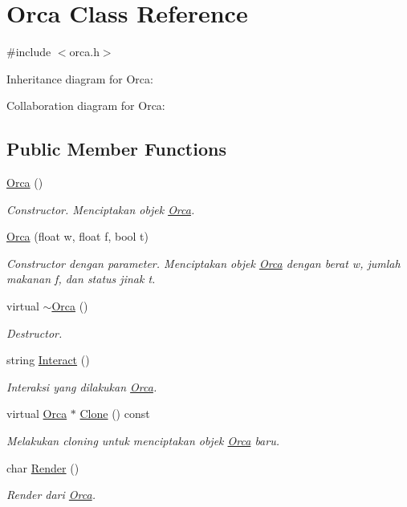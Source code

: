 \hypertarget{classOrca}{}\section{Orca Class Reference}
\label{classOrca}


{\ttfamily \#include $<$orca.\+h$>$}



Inheritance diagram for Orca\+:


Collaboration diagram for Orca\+:
\subsection*{Public Member Functions}
\begin{DoxyCompactItemize}
\item 
\hyperlink{classOrca_a1efb2589b67f95863f7c8a653cfb13f3}{Orca} ()
\begin{DoxyCompactList}\small\item\em Constructor. Menciptakan objek \hyperlink{classOrca}{Orca}. \end{DoxyCompactList}\item 
\hyperlink{classOrca_aed38e6130ea0084cc65031262bbdf39a}{Orca} (float w, float f, bool t)
\begin{DoxyCompactList}\small\item\em Constructor dengan parameter. Menciptakan objek \hyperlink{classOrca}{Orca} dengan berat w, jumlah makanan f, dan status jinak t. \end{DoxyCompactList}\item 
virtual \hyperlink{classOrca_a964d6cd8b816cfa70f5194457b9382c0}{$\sim$\+Orca} ()
\begin{DoxyCompactList}\small\item\em Destructor. \end{DoxyCompactList}\item 
string \hyperlink{classOrca_adf95ca04578ac04aaa717ef2dd11bf4c}{Interact} ()
\begin{DoxyCompactList}\small\item\em Interaksi yang dilakukan \hyperlink{classOrca}{Orca}. \end{DoxyCompactList}\item 
virtual \hyperlink{classOrca}{Orca} $\ast$ \hyperlink{classOrca_ac44eb30486ba4051eefa914dc8cd670f}{Clone} () const 
\begin{DoxyCompactList}\small\item\em Melakukan cloning untuk menciptakan objek \hyperlink{classOrca}{Orca} baru. \end{DoxyCompactList}\item 
char \hyperlink{classOrca_a0673bfc8e70af67b463a4fcae224d9d5}{Render} ()
\begin{DoxyCompactList}\small\item\em Render dari \hyperlink{classOrca}{Orca}. \end{DoxyCompactList}\end{DoxyCompactItemize}

